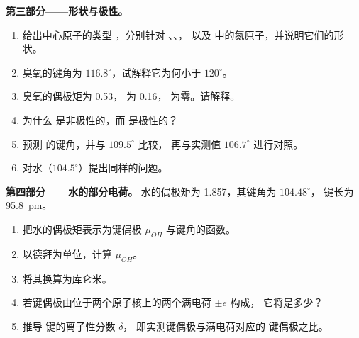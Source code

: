 \begin{problem}
\medskip
\noindent\textbf{第三部分——形状与极性。}
\begin{enumerate}[resume]
  \item 给出中心原子的类型 ，分别针对 、、，
        以及  中的氮原子，并说明它们的形状。
  \item 臭氧的键角为 $116.8^\circ$，试解释它为何小于
        $120^\circ$。
  \item 臭氧的偶极矩为 \qty{0.53}{\debye}， 为
        \qty{0.16}{\debye}， 为零。请解释。
  \item 为什么  是非极性的，而  是极性的？
  \item 预测  的键角，并与 $109.5^\circ$ 比较，
        再与实测值 $106.7^\circ$ 进行对照。
  \item 对水（$104.5^\circ$）提出同样的问题。
\end{enumerate}

\medskip
\noindent\textbf{第四部分——水的部分电荷。}
水的偶极矩为 \qty{1.857}{\debye}，其键角为
$104.48^\circ$， 键长为 \qty{95.8}{pm}。
\begin{enumerate}[resume]
  \item 把水的偶极矩表示为键偶极
        $\mu_{OH}$ 与键角的函数。
  \item 以德拜为单位，计算 $\mu_{OH}$。
  \item 将其换算为库仑米。
  \item 若键偶极由位于两个原子核上的两个满电荷 $\pm e$ 构成，
        它将是多少？
  \item 推导  键的离子性分数 $\delta$，
        即实测键偶极与满电荷对应的
        键偶极之比。
\end{enumerate}
\end{problem}
